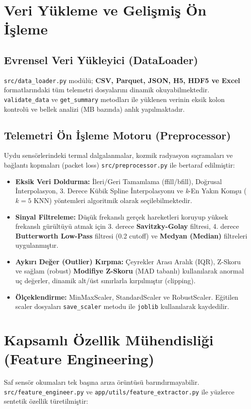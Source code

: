 \documentclass[conference,10pt]{IEEEtran}
\begin{document}
\section{Veri Yükleme ve Gelişmiş Ön İşleme}
\subsection{Evrensel Veri Yükleyici (DataLoader)}
\texttt{src/data\_loader.py} modülü; \textbf{CSV, Parquet, JSON, H5, HDF5 ve Excel} formatlarındaki tüm telemetri dosyalarını dinamik okuyabilmektedir. \texttt{validate\_data} ve \texttt{get\_summary} metodları ile yüklenen verinin eksik kolon kontrolü ve bellek analizi (MB bazında) anlık yapılmaktadır.

\subsection{Telemetri Ön İşleme Motoru (Preprocessor)}
Uydu sensörlerindeki termal dalgalanmalar, kozmik radyasyon sıçramaları ve bağlantı kopmaları (packet loss) \texttt{src/preprocessor.py} ile bertaraf edilmiştir:
\begin{itemize}
    \item \textbf{Eksik Veri Doldurma:} İleri/Geri Tamamlama (ffill/bfill), Doğrusal İnterpolasyon, 3. Derece Kübik Spline İnterpolasyonu ve \textit{k}-En Yakın Komşu ($k=5$ KNN) yöntemleri algoritmik olarak seçilebilmektedir.
    \item \textbf{Sinyal Filtreleme:} Düşük frekanslı gerçek hareketleri koruyup yüksek frekanslı gürültüyü atmak için 3. derece \textbf{Savitzky-Golay} filtresi, 4. derece \textbf{Butterworth Low-Pass} filtresi (0.2 cutoff) ve \textbf{Medyan (Median)} filtreleri uygulanmıştır.
    \item \textbf{Aykırı Değer (Outlier) Kırpma:} Çeyrekler Arası Aralık (IQR), Z-Skoru ve sağlam (robust) \textbf{Modifiye Z-Skoru} (MAD tabanlı) kullanılarak anormal uç değerler, dinamik alt/üst sınırlarla kırpılmıştır (clipping).
    \item \textbf{Ölçeklendirme:} MinMaxScaler, StandardScaler ve RobustScaler. Eğitilen scaler dosyaları \texttt{save\_scaler} metodu ile \texttt{joblib} kullanılarak kaydedilir.
\end{itemize}

\section{Kapsamlı Özellik Mühendisliği (Feature Engineering)}
Saf sensör okumaları tek başına arıza örüntüsü barındırmayabilir. \texttt{src/feature\_engineer.py} ve \texttt{app/utils/feature\_extractor.py} ile yüzlerce sentetik özellik türetilmiştir:
\end{document}
